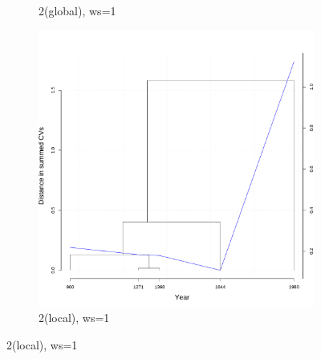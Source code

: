 \begin{figure}[H]
\begin{subfigure}{0.3\textwidth}
    \caption*{2\nds  (global), ws=1}
  \end{subfigure}
  \quad
  \begin{subfigure}{0.3\textwidth}
    \includegraphics[width=\linewidth]{figures_new/measures/VNC_measure_dist_w1_second_embed_local.pdf}
    \caption*{2\nds  (local), ws=1}
  \end{subfigure}
  

\end{figure}
